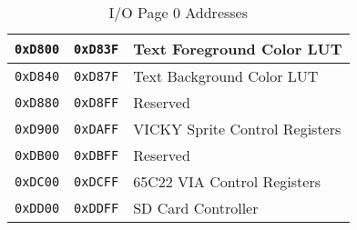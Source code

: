 \begin{table}
\begin{center}
\begin{tabular}{|c|c|l|}
            \verb+0xD800+ & \verb+0xD83F+ & Text Foreground Color LUT \\ \hline
            \verb+0xD840+ & \verb+0xD87F+ & Text Background Color LUT \\ \hline
            \verb+0xD880+ & \verb+0xD8FF+ & Reserved \\ \hline
            \verb+0xD900+ & \verb+0xDAFF+ & VICKY Sprite Control Registers \\ \hline
            \verb+0xDB00+ & \verb+0xDBFF+ & Reserved \\ \hline
            \verb+0xDC00+ & \verb+0xDCFF+ & 65C22 VIA Control Registers \\ \hline
            \verb+0xDD00+ & \verb+0xDDFF+ & SD Card Controller \\ \hline
        \end{tabular}
        \caption{I/O Page 0 Addresses}
        \label{tab:io_page_0}
    \end{center}
\end{table}
